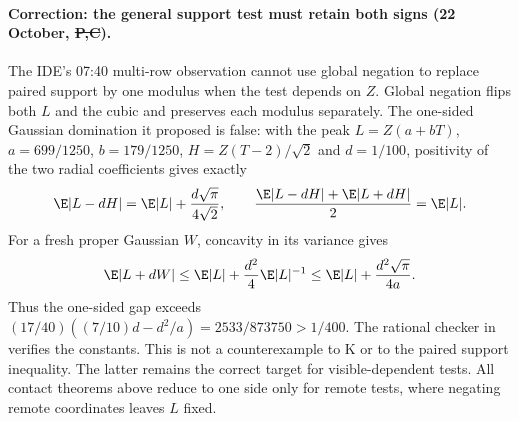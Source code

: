 \paragraph{Correction: the general support test must retain both signs
(22 October, \st{P,C}).}
The IDE's 07:40 multi-row observation cannot use global negation to
replace paired support by one modulus when the test depends on $Z$.
Global negation flips both $L$ and the cubic and preserves each modulus
separately. The one-sided Gaussian domination it proposed is false:
with the peak $L=Z(a+bT)$, $a=699/1250$, $b=179/1250$,
$H=Z(T-2)/\sqrt2$ and $d=1/100$, positivity of the two radial
coefficients gives exactly
\[
 \E|L-dH|=\E|L|+\frac{d\sqrt\pi}{4\sqrt2},\qquad
 \frac{\E|L-dH|+\E|L+dH|}{2}=\E|L|.
\]
For a fresh proper Gaussian $W$, concavity in its variance gives
\[
 \E|L+dW|\le\E|L|+\frac{d^2}{4}\E|L|^{-1}
             \le\E|L|+\frac{d^2\sqrt\pi}{4a}.
\]
Thus the one-sided gap exceeds
$(17/40)((7/10)d-d^2/a)=2533/873750>1/400$.
The rational checker in
 verifies the constants.
This is not a counterexample to K or to the paired support inequality.
The latter remains the correct target for visible-dependent tests.
All contact theorems above reduce to one side only for remote tests,
where negating remote coordinates leaves $L$ fixed.
